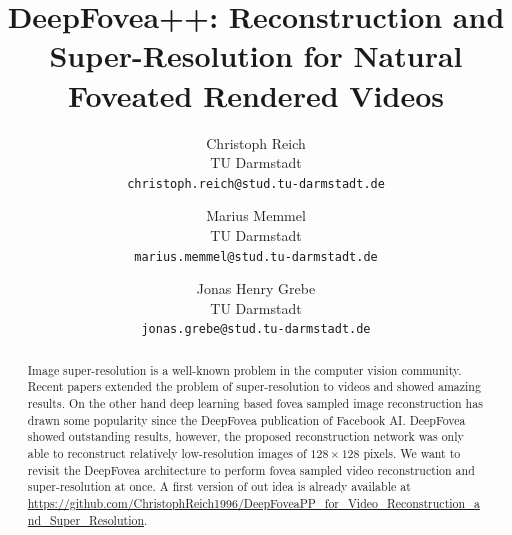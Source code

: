 \documentclass[10pt,twocolumn,letterpaper]{article}
\begin{document}
\title{DeepFovea++: Reconstruction and Super-Resolution for Natural Foveated Rendered Videos}

\author{
    Christoph Reich\\
    TU Darmstadt\\
    {\tt\small christoph.reich@stud.tu-darmstadt.de}
    
    \and
    Marius Memmel\\
    TU Darmstadt\\
    {\tt\small marius.memmel@stud.tu-darmstadt.de}
    
    \and
    Jonas Henry Grebe\\
    TU Darmstadt\\
    {\tt\small jonas.grebe@stud.tu-darmstadt.de}
}



\begin{abstract}
Image super-resolution is a well-known problem in the computer vision community. Recent papers extended the problem of super-resolution to videos and showed amazing results. On the other hand deep learning based fovea sampled image reconstruction has drawn some popularity since the DeepFovea publication of Facebook AI. DeepFovea showed outstanding results, however, the proposed reconstruction network was only able to reconstruct relatively low-resolution images of $128\times128$ pixels. We want to revisit the DeepFovea architecture to perform fovea sampled video reconstruction and super-resolution at once. A first version of out idea is already available at \url{https://github.com/ChristophReich1996/DeepFoveaPP_for_Video_Reconstruction_and_Super_Resolution}.
\end{abstract}
\end{document}
